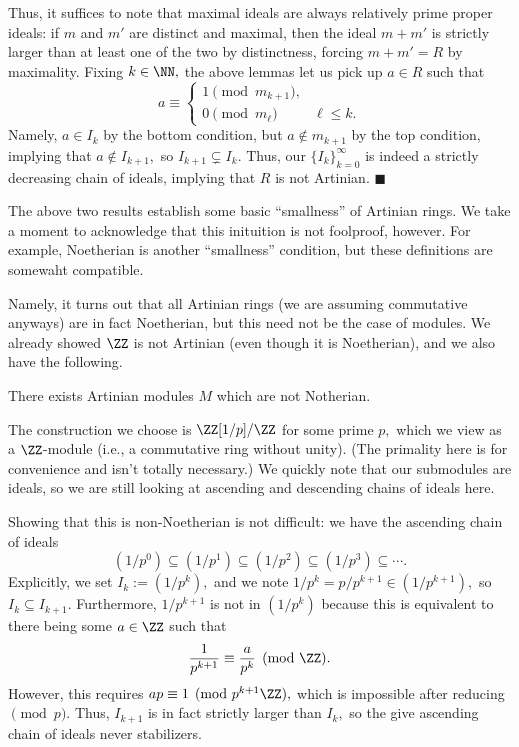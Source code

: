 Thus, it suffices to note that maximal ideals are always relatively prime proper ideals: if $m$ and $m'$ are distinct and maximal, then the ideal $m+m'$ is strictly larger than at least one of the two by distinctness, forcing $m+m'=R$ by maximality. Fixing $k\in\NN,$ the above lemmas let us pick up $a\in R$ such that
\[a\equiv\begin{cases}
    1\pmod{m_{k+1}}, \\
    0\pmod{m_\ell} & \ell\le k.
\end{cases}\]
Namely, $a\in I_k$ by the bottom condition, but $a\not\in m_{k+1}$ by the top condition, implying that $a\not\in I_{k+1},$ so $I_{k+1}\subsetneq I_k.$ Thus, our $\{I_k\}_{k=0}^\infty$ is indeed a strictly decreasing chain of ideals, implying that $R$ is not Artinian. $\blacksquare$

The above two results establish some basic ``smallness'' of Artinian rings. We take a moment to acknowledge that this inituition is not foolproof, however. For example, Noetherian is another ``smallness'' condition, but these definitions are somewaht compatible.

Namely, it turns out that all Artinian rings (we are assuming commutative anyways) are in fact Noetherian, but this need not be the case of modules. We already showed $\ZZ$ is not Artinian (even though it is Noetherian), and we also have the following.
\begin{proposition}
    There exists Artinian modules $M$ which are not Notherian.
\end{proposition}
The construction we choose is $\ZZ[1/p]/\ZZ$ for some prime $p,$ which we view as a $\ZZ$-module (i.e., a commutative ring without unity). (The primality here is for convenience and isn't totally necessary.) We quickly note that our submodules are ideals, so we are still looking at ascending and descending chains of ideals here.

Showing that this is non-Noetherian is not difficult: we have the ascending chain of ideals
\[\left(1/p^0\right)\subseteq\left(1/p^1\right)\subseteq\left(1/p^2\right)\subseteq\left(1/p^3\right)\subseteq\cdots.\]
Explicitly, we set $I_k:=\left(1/p^k\right),$ and we note $1/p^k=p/p^{k+1}\in\left(1/p^{k+1}\right),$ so $I_k\subseteq I_{k+1}.$ Furthermore, $1/p^{k+1}$ is not in $\left(1/p^k\right)$ because this is equivalent to there being some $a\in\ZZ$ such that
\[\frac1{p^{k+1}}\equiv\frac a{p^k}\pmod\ZZ.\]
However, this requires $ap\equiv1\pmod{p^{k+1}\ZZ},$ which is impossible after reducing$\pmod p.$ Thus, $I_{k+1}$ is in fact strictly larger than $I_k,$ so the give ascending chain of ideals never stabilizers.

